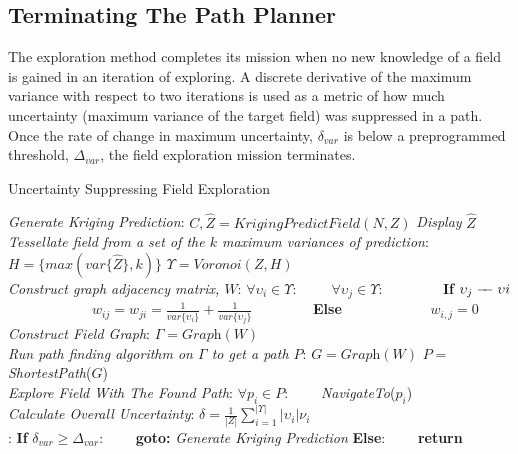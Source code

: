 \subsection{Terminating The Path Planner}
The exploration method completes its mission when no new knowledge of a field is gained in an iteration of exploring. A discrete derivative of the maximum variance with respect to two iterations is used as a metric of how much uncertainty (maximum variance of the target field) was suppressed in a path. Once the rate of change in maximum uncertainty, $\delta_{var}$ is below a preprogrammed threshold, $\Delta_{var}$, the field exploration mission terminates.

\begin{algorithm}[thpb!]
\caption{Uncertainty Suppressing Field Exploration}\label{alg:uncert}
\begin{algorithmic}[2]
    \BState \emph{Generate Kriging Prediction}:
    \State $C, \hat{Z} = \textit{KrigingPredictField}(N,Z)$
    \State \textit{Display} $\hat{Z}$\\
    \BState \emph{Tessellate field from a set of the $k$ maximum variances of prediction}:
    \State $H = \{max(var\{\hat{Z}\}, k)\}$
    \State $\Upsilon = \textit{Voronoi}(Z, H)$\\
    \BState \emph{Construct graph adjacency matrix, $W$}:
    \State $\forall \upsilon_i \in \Upsilon:$
    \State \ \ \ \ $\forall \upsilon_j \in \Upsilon$:
    \State \ \ \ \ \ \ \ \ \textbf{If} {$\upsilon_j \edge \upsilon{i}$}
    \State \ \ \ \ \ \ \ \ \ \ \ \  $w_{ij} = w_{ji} = \frac{1}{var\{\upsilon_i\}} + \frac{1}{var\{\upsilon_j\}}$
    \State \ \ \ \ \ \ \ \ \textbf{Else}
    \State \ \ \ \ \ \ \ \ \ \ \ \  $w_{i,j} = 0$\\
    \BState \emph{Construct Field Graph}:
    \State $\Gamma = \textit{Graph}(W)$\\
    \BState \emph{Run path finding algorithm on $\Gamma$ to get a path $P$}:
    \State $G = \textit{Graph}(W)$
    \State $P = $ \textit{ShortestPath}($G$)\\
    \BState \emph{Explore Field With The Found Path}:
    \State $\forall p_i \in P$:
    \State \ \ \ \ \textit{NavigateTo}($p_i$)\\
    \BState \emph{Calculate Overall Uncertainty}:
    \State $\delta = \frac{1}{|Z|} \sum_{i = 1}^{|\Upsilon|} |\upsilon_i| \nu_i$\\
    :
    \State \textbf{If} $\delta_{var} \geq \Delta_{var}$:
    \State \ \ \ \ \textbf{goto:} \textit{Generate Kriging Prediction}
    \State \textbf{Else}:
    \State \ \ \ \ \textbf{return}
\EndProcedure
\end{algorithmic}
\end{algorithm}
